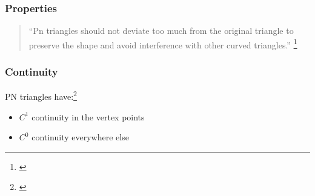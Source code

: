 

\begin{frame}\frametitle{Properties}
	\begin{quote}
		``Pn triangles should not deviate too much from the original triangle to preserve the shape and avoid interference with other curved triangles.''
		\footnote{\citeauthor{vlachos2001curved}}
	\end{quote}
\end{frame}

\begin{frame}\frametitle{Continuity}	
	PN triangles have:\footnote{\citeauthor{jiao2005parallel}}
	\begin{itemize}
		\item $C^1$ continuity in the vertex points
		\item $C^0$ continuity everywhere else
	\end{itemize}
\end{frame}


